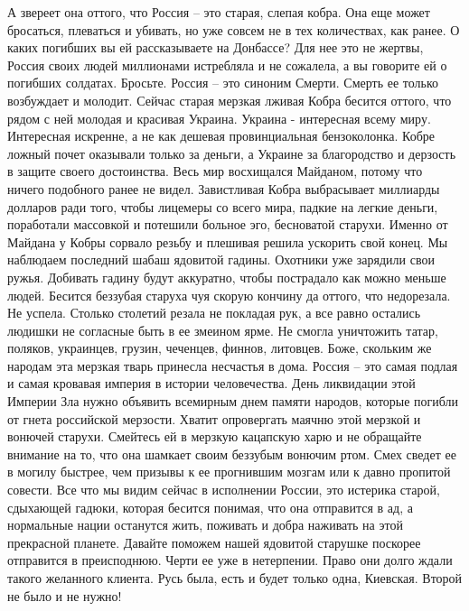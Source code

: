 А звереет она оттого, что Россия – это старая, слепая кобра. Она еще может бросаться, плеваться и убивать, но уже совсем не в тех количествах, как ранее.
О каких погибших вы ей рассказываете на Донбассе? Для нее это не жертвы, Россия своих людей миллионами истребляла и не сожалела, а вы говорите ей о погибших солдатах. Бросьте. Россия – это синоним Смерти. Смерть ее только возбуждает и молодит.
Сейчас старая мерзкая лживая Кобра бесится оттого, что рядом с ней молодая и красивая Украина. Украина - интересная всему миру. Интересная искренне, а не как дешевая провинциальная бензоколонка. Кобре ложный почет оказывали только за деньги, а Украине за благородство и дерзость в защите своего достоинства. Весь мир восхищался Майданом, потому что ничего подобного ранее не видел. Завистливая Кобра выбрасывает миллиарды долларов ради того, чтобы лицемеры со всего мира, падкие на легкие деньги, поработали массовкой и потешили больное эго, бесноватой старухи.
Именно от Майдана у Кобры сорвало резьбу и плешивая решила ускорить свой конец. Мы наблюдаем последний шабаш ядовитой гадины. Охотники уже зарядили свои ружья. Добивать гадину будут аккуратно, чтобы пострадало как можно меньше людей.
Бесится беззубая старуха чуя скорую кончину да оттого, что недорезала. Не успела. Столько столетий резала не покладая рук, а все равно остались людишки не согласные быть в ее змеином ярме. Не смогла уничтожить татар, поляков, украинцев, грузин, чеченцев, финнов, литовцев. Боже, скольким же народам эта мерзкая тварь принесла несчастья в дома.
Россия – это самая подлая и самая кровавая империя в истории человечества. День ликвидации этой Империи Зла нужно объявить всемирным днем памяти народов, которые погибли от гнета российской мерзости.
Хватит опровергать маячню этой мерзкой и вонючей старухи. Смейтесь ей в мерзкую кацапскую харю и не обращайте внимание на то, что она шамкает своим беззубым вонючим ртом. Смех сведет ее в могилу быстрее, чем призывы к ее прогнившим мозгам или к давно пропитой совести.
Все что мы видим сейчас в исполнении России, это истерика старой, сдыхающей гадюки, которая бесится понимая, что она отправится в ад, а нормальные нации останутся жить, поживать и добра наживать на этой прекрасной планете.
Давайте поможем нашей ядовитой старушке поскорее отправится в преисподнюю. Черти ее уже в нетерпении. Право они долго ждали такого желанного клиента.
Русь была, есть и будет только одна, Киевская. Второй не было и не нужно!

